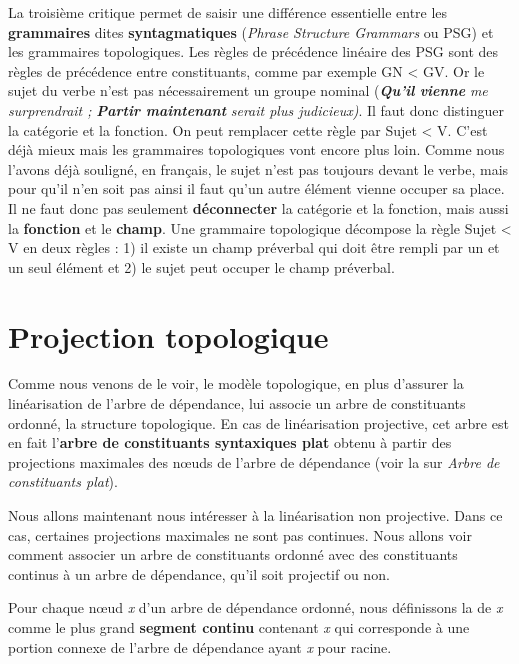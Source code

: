 {    La troisième critique permet de saisir une différence essentielle entre les \textbf{grammaires} dites \textbf{syntagmatiques} (\textit{Phrase Structure Grammars} ou PSG) et les grammaires topologiques. Les règles de précédence linéaire des PSG sont des règles de précédence entre constituants, comme par exemple GN < GV. Or le sujet du verbe n’est pas nécessairement un groupe nominal (\textbf{\textit{Qu’il} \textit{vienne}} \textit{me surprendrait ;} \textbf{\textit{Partir maintenant}} \textit{serait plus judicieux)}. Il faut donc distinguer la catégorie et la fonction. On peut remplacer cette règle par Sujet < V. C’est déjà mieux mais les grammaires topologiques vont encore plus loin. Comme nous l’avons déjà souligné, en français, le sujet n’est pas toujours devant le verbe, mais pour qu’il n’en soit pas ainsi il faut qu’un autre élément vienne occuper sa place. Il ne faut donc pas seulement \textbf{déconnecter} la catégorie et la fonction, mais aussi la \textbf{fonction} et le \textbf{champ}. Une grammaire topologique décompose la règle Sujet < V en deux règles : 1) il existe un champ préverbal qui doit être rempli par un et un seul élément et 2) le sujet peut occuper le champ préverbal.
}
\section{Projection topologique}\label{sec:3.5.30}

Comme nous venons de le voir, le modèle topologique, en plus d’assurer la linéarisation de l’arbre de dépendance, lui associe un arbre de constituants ordonné, la structure topologique. En cas de linéarisation projective, cet arbre est en fait l’\textbf{arbre de constituants syntaxiques plat} obtenu à partir des projections maximales des nœuds de l’arbre de dépendance (voir la  sur \textit{Arbre de constituants plat}).

Nous allons maintenant nous intéresser à la linéarisation non projective. Dans ce cas, certaines projections maximales ne sont pas continues. Nous allons voir comment associer un arbre de constituants ordonné avec des constituants continus à un arbre de dépendance, qu’il soit projectif ou non.

\begin{styleLivreImportant}
Pour chaque nœud \textit{x} d’un arbre de dépendance ordonné, nous définissons la  de \textit{x} comme le plus grand \textbf{segment continu} contenant \textit{x} qui corresponde à une portion connexe de l’arbre de dépendance ayant \textit{x} pour racine.
\end{styleLivreImportant}

